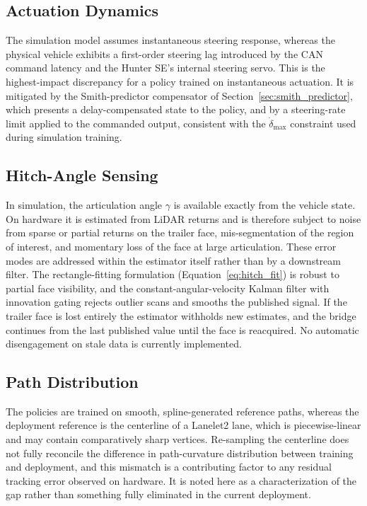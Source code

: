 \subsection{Actuation Dynamics}
\label{sec:gap_actuation}

The simulation model assumes instantaneous steering response, whereas the physical vehicle exhibits a first-order steering lag introduced by the CAN command latency and the Hunter SE's internal steering servo. This is the highest-impact discrepancy for a policy trained on instantaneous actuation. It is mitigated by the Smith-predictor compensator of Section~\ref{sec:smith_predictor}, which presents a delay-compensated state to the policy, and by a steering-rate limit applied to the commanded output, consistent with the $\dot{\delta}_\text{max}$ constraint used during simulation training.

\subsection{Hitch-Angle Sensing}
\label{sec:gap_hitch}

In simulation, the articulation angle $\gamma$ is available exactly from the vehicle state. On hardware it is estimated from LiDAR returns and is therefore subject to noise from sparse or partial returns on the trailer face, mis-segmentation of the region of interest, and momentary loss of the face at large articulation. These error modes are addressed within the estimator itself rather than by a downstream filter. The rectangle-fitting formulation (Equation~\ref{eq:hitch_fit}) is robust to partial face visibility, and the constant-angular-velocity Kalman filter with innovation gating rejects outlier scans and smooths the published signal. If the trailer face is lost entirely the estimator withholds new estimates, and the bridge continues from the last published value until the face is reacquired. No automatic disengagement on stale data is currently implemented.

\subsection{Path Distribution}

The policies are trained on smooth, spline-generated reference paths, whereas the deployment reference is the centerline of a Lanelet2 lane, which is piecewise-linear and may contain comparatively sharp vertices. Re-sampling the centerline does not fully reconcile the difference in path-curvature distribution between training and deployment, and this mismatch is a contributing factor to any residual tracking error observed on hardware. It is noted here as a characterization of the gap rather than something fully eliminated in the current deployment.

